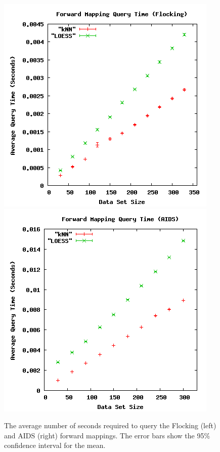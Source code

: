 \begin{figure}[ht]
\centering
\includegraphics[scale=.4]{images/results_flocking/fmquery.png}
\includegraphics[scale=.4]{images/results_aids/aids-fmquery.png}
\caption{The average number of seconds required to query the Flocking (left) and AIDS (right) forward mappings.
The error bars show the 95\% confidence interval for the mean.}
\label{fig:fmquery}
\end{figure}



